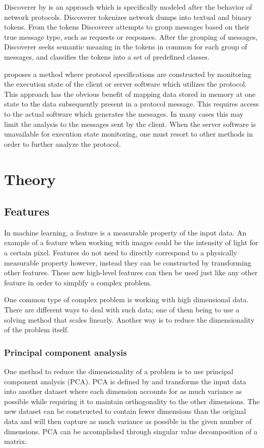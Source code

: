 \documentclass[a4paper]{report}
\begin{document}
Discoverer by \citeauthor{cui07} is an approach which is specifically modeled
after the behavior of network protocols. Discoverer tokenizes
network dumps into textual and binary tokens. From the tokens Discoverer
attempts to group messages based on their true message type, such as requests
or responses. After the grouping of messages, Discoverer seeks semantic meaning
in the tokens in common for each group of messages, and classifies the tokens
into a set of predefined classes. 

\citet{caballero12} proposes a method where protocol specifications are
constructed by monitoring the execution state of the client or server software
which utilizes the protocol. This approach has the obvious benefit of mapping
data stored in memory at one state to the data subsequently present in a
protocol message. This requires access to the actual software which generates
the messages. In many cases this may limit the analysis to the messages sent by
the client. When the server software is unavailable for execution state
monitoring, one must resort to other methods in order to further analyze the
protocol.

\chapter{Theory}

\section{Features}
In machine learning, a feature is a measurable property of the input data. An
example of a feature when working with images could be the intensity of light
for a certain pixel. Features do not need to directly correspond to a
physically measurable property however, instead they can be constructed by
transforming other features. These new high-level features can then be used
just like any other feature in order to simplify a complex problem.

One common type of complex problem is working with high dimensional data. There
are different ways to deal with such data; one of them being to use a solving
method that scales linearly. Another way is to reduce the dimensionality of the
problem itself.

\subsection{Principal component analysis}
\label{sec:pca}
One method to reduce the dimensionality of a problem is to use principal
component analysis (PCA). PCA is defined by \citet{jolliffe86} and transforms
the input data into another dataset where each dimension accounts for as much
variance as possible while requiring it to maintain orthogonality to the other
dimensions. The new dataset can be constructed to contain fewer dimensions than
the original data and will then capture as much variance as possible in the
given number of dimensions. PCA can be accomplished through singular value
decomposition of a matrix.
\end{document}
